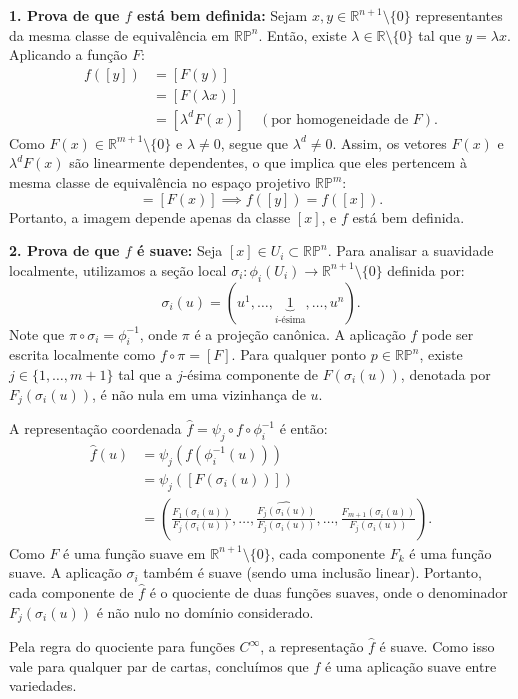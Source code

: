 {	\textbf{1. Prova de que $f$ está bem definida:}
	Sejam $x, y \in \mathbb{R}^{n+1} \setminus \{0\}$ representantes da mesma classe de equivalência em $\mathbb{RP}^n$. Então, existe $\lambda \in \mathbb{R} \setminus \{0\}$ tal que $y = \lambda x$. Aplicando a função $F$:
	\begin{align*}
		f([y]) &= [F(y)] \\
		&= [F(\lambda x)] \\
		&= [\lambda^d F(x)] \quad (\text{por homogeneidade de } F).
	\end{align*}
	Como $F(x) \in \mathbb{R}^{m+1} \setminus \{0\}$ e $\lambda \neq 0$, segue que $\lambda^d \neq 0$. Assim, os vetores $F(x)$ e $\lambda^d F(x)$ são linearmente dependentes, o que implica que eles pertencem à mesma classe de equivalência no espaço projetivo $\mathbb{RP}^m$:
	\begin{equation*}
		[\lambda^d F(x)] = [F(x)] \implies f([y]) = f([x]).
	\end{equation*}
	Portanto, a imagem depende apenas da classe $[x]$, e $f$ está bem definida.
	
	\textbf{2. Prova de que $f$ é suave:}
	Seja $[x] \in U_i \subset \mathbb{RP}^n$. Para analisar a suavidade localmente, utilizamos a seção local $\sigma_i : \phi_i(U_i) \to \mathbb{R}^{n+1} \setminus \{0\}$ definida por:
	\begin{equation*}
		\sigma_i(u) = (u^1, \dots, \underbrace{1}_{i\text{-ésima}}, \dots, u^n).
	\end{equation*}
	Note que $\pi \circ \sigma_i = \phi_i^{-1}$, onde $\pi$ é a projeção canônica. A aplicação $f$ pode ser escrita localmente como $f \circ \pi = [F]$. Para qualquer ponto $p \in \mathbb{RP}^n$, existe $j \in \{1, \dots, m+1\}$ tal que a $j$-ésima componente de $F(\sigma_i(u))$, denotada por $F_j(\sigma_i(u))$, é não nula em uma vizinhança de $u$. 
	
	A representação coordenada $\hat{f} = \psi_j \circ f \circ \phi_i^{-1}$ é então:
	\begin{align*}
		\hat{f}(u) &= \psi_j( f(\phi_i^{-1}(u)) ) \\
		&= \psi_j( [F(\sigma_i(u))] ) \\
		&= \left( \frac{F_1(\sigma_i(u))}{F_j(\sigma_i(u))}, \dots, \widehat{\frac{F_j(\sigma_i(u))}{F_j(\sigma_i(u))}}, \dots, \frac{F_{m+1}(\sigma_i(u))}{F_j(\sigma_i(u))} \right).
	\end{align*}
	Como $F$ é uma função suave em $\mathbb{R}^{n+1} \setminus \{0\}$, cada componente $F_k$ é uma função suave. A aplicação $\sigma_i$ também é suave (sendo uma inclusão linear). Portanto, cada componente de $\hat{f}$ é o quociente de duas funções suaves, onde o denominador $F_j(\sigma_i(u))$ é não nulo no domínio considerado.
	
	Pela regra do quociente para funções $C^\infty$, a representação $\hat{f}$ é suave. Como isso vale para qualquer par de cartas, concluímos que $f$ é uma aplicação suave entre variedades.
}

